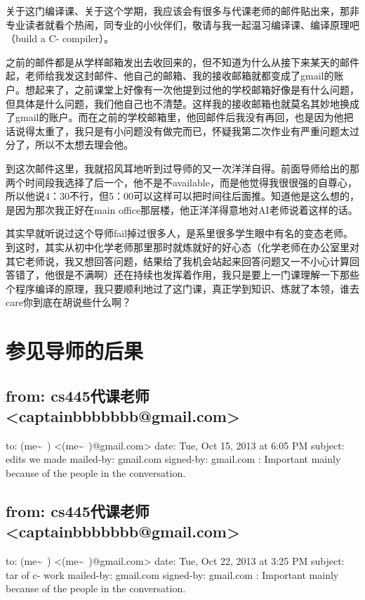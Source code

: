 \documentclass[12pt]{book}
\begin{document}
关于这门编译课、关于这个学期，我应该会有很多与代课老师的邮件贴出来，那非专业读者就看个热闹，同专业的小伙伴们，敬请与我一起温习编译课、编译原理吧（build a C- compiler）。

之前的邮件都是从学样邮箱发出去收回来的，但不知道为什么从接下来某天的邮件起，老师给我发这封邮件、他自己的邮箱、我的接收邮箱就都变成了gmail的账户。想起来了，之前课堂上好像有一次他提到过他的学校邮箱好像是有什么问题，但具体是什么问题，我们他自己也不清楚。这样我的接收邮箱也就莫名其妙地换成了gmail的账户。而在之前的学校邮箱里，他回邮件后我没有再回，也是因为他把话说得太重了，我只是有小问题没有做完而已，怀疑我第二次作业有严重问题太过分了，所以不太想去理会他。

到这次邮件这里，我就招风耳地听到过导师的又一次洋洋自得。前面导师给出的那两个时间段我选择了后一个，他不是不available，而是他觉得我很很强的自尊心，所以他说4：30不行，但5：00可以这样可以把时间往后面推。知道他是这么想的，是因为那次我正好在main office那层楼，他正洋洋得意地对AI老师说着这样的话。

其实早就听说过这个导师fail掉过很多人，是系里很多学生眼中有名的变态老师。到这时，其实从初中化学老师那里那时就炼就好的好心态（化学老师在办公室里对其它老师说，我又想回答问题，结果给了我机会站起来回答问题又一不小心计算回答错了，他很是不满啊）还在持续也发挥着作用，我只是要上一门课理解一下那些个程序编译的原理，我只要顺利地过了这门课，真正学到知识、炼就了本领，谁去care你到底在胡说些什么啊？

\chapter{参见导师的后果}
\label{sec-23}

\section{from:         cs445代课老师 <captainbbbbbbb@gmail.com>}
\label{sec-23-1}
to:         (me\textasciitilde{}~) <(me\textasciitilde{}~)@gmail.com>
date:         Tue, Oct 15, 2013 at 6:05 PM
subject:         edits we made
mailed-by:         gmail.com
signed-by:         gmail.com
:         Important mainly because of the people in the conversation.

\section{from:         cs445代课老师 <captainbbbbbbb@gmail.com>}
\label{sec-23-2}
to:         (me\textasciitilde{}~) <(me\textasciitilde{}~)@gmail.com>
date:         Tue, Oct 22, 2013 at 3:25 PM
subject:         tar of c- work
mailed-by:         gmail.com
signed-by:         gmail.com
:         Important mainly because of the people in the conversation.
\end{document}
